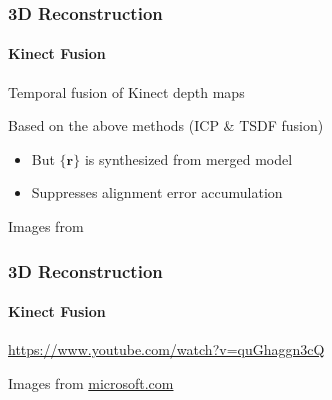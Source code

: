 \documentclass[xetex,professionalfont]{beamer}
\renewcommand{\vec}[1]{\ensuremath{\mathbf{#1}}}
\newcommand{\vr}{\vec{r}}
\begin{document}

\begin{frame}
\frametitle{3D Reconstruction}
\framesubtitle{Kinect Fusion}

Temporal fusion of Kinect depth maps

\bigskip
Based on the above methods (ICP \& TSDF fusion)
\begin{itemize}
	\item But $\{\vr\}$ is synthesized from merged model
	\item Suppresses alignment error accumulation %
\end{itemize}

\begin{center}
    {\centering Images from \cite{newcombe2011}}
\end{center}

\end{frame}


\begin{frame}
\frametitle{3D Reconstruction}
\framesubtitle{Kinect Fusion}

\begin{center}
	\url{https://www.youtube.com/watch?v=quGhaggn3cQ}
\end{center}

\begin{center}
    {\centering Images from \url{microsoft.com}}
\end{center}

\end{frame}
\end{document}
